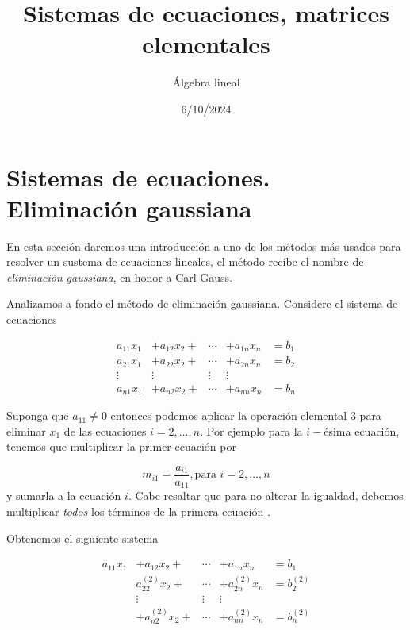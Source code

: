 \documentclass[
]{article}
\title{Sistemas de ecuaciones, matrices elementales}
\author{Álgebra lineal}
\date{6/10/2024}
\begin{document}
\maketitle

\hypertarget{sistemas-de-ecuaciones.-eliminaciuxf3n-gaussiana}{%
\section{Sistemas de ecuaciones. Eliminación
gaussiana}\label{sistemas-de-ecuaciones.-eliminaciuxf3n-gaussiana}}

\small

En esta sección daremos una introducción a uno de los métodos más usados
para resolver un sustema de ecuaciones lineales, el método recibe el
nombre de \emph{eliminación} \emph{gaussiana}, en honor a Carl Gauss.

Analizamos a fondo el método de eliminación gaussiana. Considere el
sistema de ecuaciones

\begin{equation}
  \begin{matrix}
     a_{11} x_1 & +a_{12} x_2 + & \cdots   & +a_{1n} x_n  &= b_1  \\
     a_{21} x_1 & +a_{22} x_2 + & \cdots   & +a_{2n} x_n  &= b_2\\
    \vdots    & \vdots  & \vdots   & \vdots \\
     a_{n1} x_1 & +a_{n2} x_2 + & \cdots   & +a_{nn} x_n  & =b_n
  \end{matrix}
\end{equation}

Suponga que \(a_{11}\ne 0\) entonces podemos aplicar la operación
elemental \(3\) para eliminar \(x_1\) de las ecuaciones
\(i=2,\ldots,n\). Por ejemplo para la \(i-\)ésima ecuación, tenemos que
multiplicar la primer ecuación por

\begin{equation*}
m_{i1}=\frac{a_{i1}}{a_{11}}, \mbox{para }i=2,\ldots,n
\end{equation*} y sumarla a la ecuación \(i\). Cabe resaltar que para no
alterar la igualdad, debemos multiplicar \emph{todos} los términos de la
primera ecuación .

Obtenemos el siguiente sistema

\begin{equation}
  \begin{matrix}
     a_{11} x_1 & +a_{12} x_2      + & \cdots   & +a_{1n} x_n  &= b_1  \\
                & a^{(2)}_{22} x_2 + & \cdots   & +a^{(2)}_{2n} x_n  &= b^{(2)}_2\\
               & \vdots  & \vdots   & \vdots \\
               & +a^{(2)}_{n2} x_2 + & \cdots   & +a^{(2)}_{nn} x_n  & =b^{(2)}_n
  \end{matrix}
\end{equation}
\end{document}
